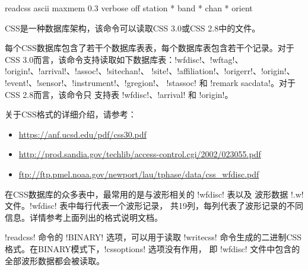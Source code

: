 \begin{SACSTX}
readcss ascii maxmem 0.3 verbose off station * band * chan * orient
\end{SACSTX}

CSS是一种数据库架构，该命令可以读取CSS 3.0或CSS 2.8中的文件。

每个CSS数据库包含了若干个数据库表表，每个数据库表包含若干个记录。对于
CSS 3.0而言，该命令支持读取如下数据库表：!wfdisc!、!wftag!、
!origin!、!arrival!、!assoc!、!sitechan!、
!site!、!affiliation!、!origerr!、!origin!、
!event!、!sensor!、!instrument!、!gregion!、
!stassoc! 和 !remark sacdata!。对于CSS 2.8而言，该命令只
支持表 !wfdisc!、!arrival! 和 !origin!。

关于CSS格式的详细介绍，请参考：
\begin{itemize}
\item \url{https://anf.ucsd.edu/pdf/css30.pdf}
\item \url{http://prod.sandia.gov/techlib/access-control.cgi/2002/023055.pdf}
\item \url{ftp://ftp.pmel.noaa.gov/newport/lau/tphase/data/css_wfdisc.pdf}
\end{itemize}

在CSS数据库的众多表中，最常用的是与波形相关的 !wfdisc! 表以及
波形数据 !.w! 文件。!wfdisc! 表中每行代表一个波形记录，
共19列，每列代表了波形记录的不同信息。详情参考上面列出的格式说明文档。

!readcss! 命令的 !BINARY! 选项，可以用于读取 !writecss!
命令生成的二进制CSS格式。在BINARY模式下，!cssoptions! 选项没有作用，
即 !wfdisc! 文件中包含的全部波形数据都会被读取。
